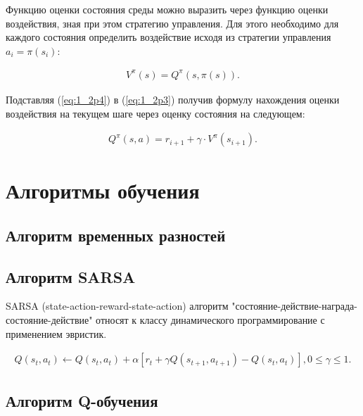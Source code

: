 Функцию оценки состояния среды можно выразить через функцию оценки воздействия, зная при этом стратегию управления. Для этого необходимо для каждого состояния определить воздействие исходя из стратегии управления $ a_i = \pi(s_i) $:

\begin{equation}
\label{eq:1_2p4}
\begin{alignedat}{2}
V^\pi(s) = Q^\pi(s, \pi(s)).
\end{alignedat}
\end{equation}

Подставляя (\ref{eq:1_2p4}) в (\ref{eq:1_2p3}) получив формулу нахождения оценки воздействия на текущем шаге через оценку состояния на следующем:

\begin{equation}
\label{eq:1_2p5}
\begin{alignedat}{2}
Q^\pi(s, a) = r_{i+1} + \gamma\cdot V^\pi(s_{i+1}).
\end{alignedat}
\end{equation}

\section{Алгоритмы обучения} \label{sect1_3}

\subsection{Алгоритм временных разностей} \label{subsect1_3_1}

\subsection{Алгоритм SARSA} \label{subsect1_3_2}
SARSA (state-action-reward-state-action) алгоритм "состояние-действие-награда-состояние-действие" относят к классу динамического программирование с применением эвристик. 

\begin{equation}
\label{eq:1_3_2p1}
\begin{alignedat}{2}
Q(s_{t},a_{t}) \leftarrow Q(s_{t},a_{t}) + \alpha[r_{t} + \gamma Q(s_{t+1},a_{t+1}) - Q(s_{t},a_{t})], 0 \le \gamma \le 1.
\end{alignedat}
\end{equation}

\subsection{Алгоритм Q-обучения} \label{subsect1_3_3}

